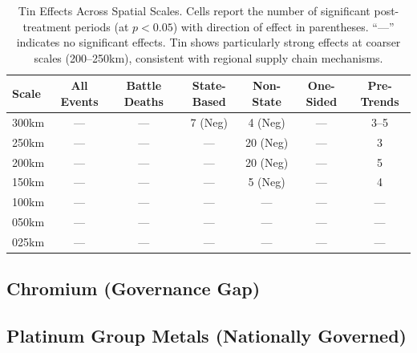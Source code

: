 \documentclass[11pt]{article}
\begin{document}
\begin{table}[H]
\centering
\caption{Tin Effects Across Spatial Scales. Cells report the number of significant post-treatment periods (at $p<0.05$) with direction of effect in parentheses. ``---'' indicates no significant effects. Tin shows particularly strong effects at coarser scales (200--250km), consistent with regional supply chain mechanisms.}
\label{tab:tin_robustness}
\begin{tabular}{lcccccc}
\toprule
Scale & All Events & Battle Deaths & State-Based & Non-State & One-Sided & Pre-Trends \\
\midrule
300km & ---       & ---           & 7 (Neg)     & 4 (Neg)   & ---       & 3--5       \\
250km & ---       & ---           & ---         & 20 (Neg)  & ---       & 3          \\
200km & ---       & ---           & ---         & 20 (Neg)  & ---       & 5          \\
150km & ---       & ---           & ---         & 5 (Neg)   & ---       & 4          \\
100km & ---       & ---           & ---         & ---       & ---       & ---        \\
050km & ---       & ---           & ---         & ---       & ---       & ---        \\
025km & ---       & ---           & ---         & ---       & ---       & ---        \\
\bottomrule
\end{tabular}
\end{table}

\subsection{Chromium (Governance Gap)}








\subsection{Platinum Group Metals (Nationally Governed)}


\end{document}
